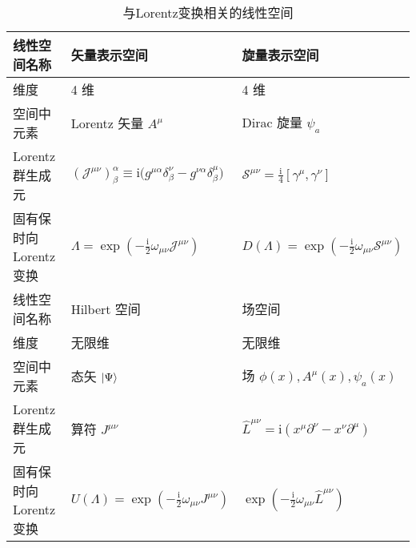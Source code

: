 \begin{table}[htbp]
\centering
\caption{与Lorentz变换相关的线性空间}
\begin{tabular}{lll}
\toprule
线性空间名称 & 矢量表示空间 & 旋量表示空间 \\
\midrule
维度 & 4 维 & 4 维 \\
空间中元素 & Lorentz 矢量 $A^{\mu}$ & Dirac 旋量 $\psi_{a}$ \\
Lorentz 群生成元 & $\displaystyle (\mathcal{J}^{\mu\nu})^{\alpha}_{\beta} \equiv \mathrm{i}\big(g^{\mu\alpha}\delta^{\nu}_{\beta} - g^{\nu\alpha}\delta^{\mu}_{\beta}\big)$ & $\displaystyle \mathcal{S}^{\mu\nu} = \frac{\mathrm{i}}{4}[\gamma^{\mu},\gamma^{\nu}]$ \\
固有保时向 Lorentz 变换 & $\displaystyle \Lambda = \exp\left(-\frac{\mathrm{i}}{2}\omega_{\mu\nu}\mathcal{J}^{\mu\nu}\right)$ & $\displaystyle D(\Lambda) = \exp\left(-\frac{\mathrm{i}}{2}\omega_{\mu\nu}\mathcal{S}^{\mu\nu}\right)$ \\
\midrule
线性空间名称 & Hilbert 空间 & 场空间 \\
\midrule
维度 & 无限维 & 无限维 \\
空间中元素 & 态矢 $\ket{\Psi}$ & 场 $\phi(x), A^{\mu}(x), \psi_{a}(x)$ \\
Lorentz 群生成元 & 算符 $J^{\mu\nu}$ & $\displaystyle \hat{L}^{\mu\nu} = \mathrm{i}(x^{\mu}\partial^{\nu} - x^{\nu}\partial^{\mu})$ \\
固有保时向 Lorentz 变换 & $\displaystyle U(\Lambda) = \exp\left(-\frac{\mathrm{i}}{2}\omega_{\mu\nu}J^{\mu\nu}\right)$ & $\displaystyle \exp\left(-\frac{\mathrm{i}}{2}\omega_{\mu\nu}\hat{L}^{\mu\nu}\right)$ \\
\bottomrule
\end{tabular}
\end{table}




